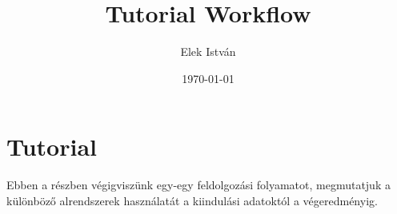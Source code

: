 \documentclass[a4paper,12pt]{article}
\begin{document}
	
	\author{Elek István}
	
	\title{Tutorial  \linebreak  \linebreak \small Workflow \linebreak \linebreak}
	
	
	\date{\today}
	
	
	\setcounter{tocdepth}{3}
	\maketitle
	\newpage
	\tableofcontents
	\newpage


\section{Tutorial}

Ebben a részben végigviszünk egy-egy feldolgozási folyamatot, megmutatjuk a különböző alrendszerek használatát a kiindulási adatoktól a végeredményig.
\end{document}
